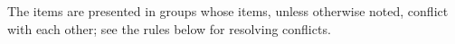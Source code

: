 \documentclass[12pt]{article}
\makeatletter
\newcommand{\TT}[1]{{\tt \bfseries #1}}
\newcommand{\ttmkey}[2]{\TT{#1}\index{#1@{\tt #1}!#2}}
\makeatother
\begin{document}
The items are presented in groups whose items, unless otherwise noted, conflict
with each other; see the rules below for resolving conflicts.

\newcommand{\BEGINGROUP}[2][]{
\begin{tabular}{rllp{4.0in}}
\hspace*{0.1in} & \hspace*{0.1in} & \hspace*{0.4in} \\[-2ex]
& \multicolumn{3}{l}{{\bf #2}\ifstrequal{}{#1}{}{ ~~~~~ #1}} \\
}
\newcommand{\GROUPENTRY}[2][]{
&& \ttmkey{#2}{table format}\ifstrequal{}{#1}{}{\TT{<}{\em #1}\TT{>}} &
}
\newcommand{\GROUPNEWLINE}{\\&&&}
\newcommand{\ENDGROUP}{\end{tabular}}
\end{document}
